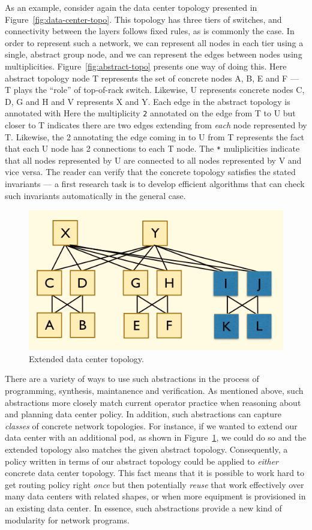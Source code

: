 As an example, consider again the data center topology presented in
Figure~\ref{fig:data-center-topo}.  This topology has three tiers of
switches, and connectivity between the layers follows fixed rules,
as is commonly the case.  In order to represent such a network,
we can represent all nodes in each tier using a single, abstract group
node, and we can represent the edges between nodes using multiplicities.
Figure~\ref{fig:abstract-topo} presents one way of doing this.
Here abstract topology node T represents the set of concrete nodes
A, B, E and F --- T plays the ``role'' of top-of-rack switch.  Likewise,
U represents concrete nodes C, D, G and H and V represents X and Y.
Each edge in the abstract topology is annotated with 
Here the multiplicity \texttt{2} annotated on the edge from T to U but closer
to T indicates there are two edges extending from \emph{each} node
represented by T.  Likewise, the 2 annotating the edge coming
in to U from T represents the fact that each U node has 2 connections
to each T node.  The \texttt{*} muliplicities indicate that all nodes
represented by U are connected to all nodes represented by V and vice
versa.  The reader can verify that the concrete topology satisfies the
stated invariants --- a first research task is to develop efficient algorithms
that can check such invariants automatically in the general case.

\begin{figure}
  \centering
  \includegraphics[width=.35\textwidth]{figures/extended-topo}
\caption{Extended data center topology.}
  \label{fig:extended-topo}
  \vspace{-1em}
\end{figure}
There are a variety of ways to use such abstractions in the process of
programming, synthesis, maintanence and verification.  As mentioned above,
such abstractions more closely match current operator practice when
reasoning about and planning data center policy.  In addition, such
abstractions can capture \emph{classes} of concrete network topologies.
For instance, if we wanted to extend our data center with an additional pod,
as shown in Figure~\ref{fig:extended-topo}, we could do so and 
the extended topology also
matches the given abstract topology.  Consequently, a policy written in
terms of our abstract topology could be applied to \emph{either} concrete
data center topology.  This fact means that it is possible to work hard
to get routing policy right \emph{once} but then potentially \emph{reuse} that
work effectively over many data centers with related shapes, or when more
equipment is provisioned in an existing data center.  In essence,
such abstractions provide a new kind of modularity for network programs.

